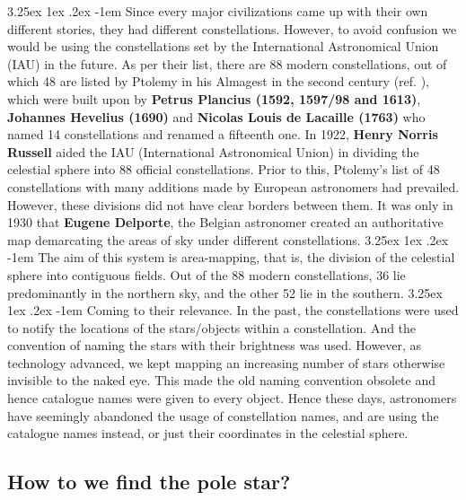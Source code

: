 \documentclass[a4paper,twoside,11pt]{article}
\makeatletter
\numberwithin{equation}{section}
\renewcommand\paragraph{\@startsection{paragraph}{5}{\z@}%
  {3.25ex \@plus1ex \@minus.2ex}%
  {-1em}%
  {\normalfont\normalsize\bfseries}}
\makeatother
\begin{document}
\paragraph{}
Since every major civilizations came up with their own different stories, they had different constellations. However, to avoid confusion we would be using the constellations set by the International Astronomical Union (IAU) in the future. As per their list, there are 88 modern constellations, out of which 48 are listed by Ptolemy in his Almagest in the second century (ref. \cite{wiki_constellation}), which were built upon by \textbf{Petrus Plancius (1592, 1597/98 and 1613)}, \textbf{Johannes Hevelius (1690)} and \textbf{Nicolas Louis de Lacaille (1763)} who named 14 constellations and renamed a fifteenth one. In 1922, \textbf{Henry Norris Russell} aided the IAU (International Astronomical Union) in dividing the celestial sphere into 88 official constellations. Prior to this, Ptolemy's list of 48 constellations with many additions made by European astronomers had prevailed. However, these divisions did not have clear borders between them. It was only in 1930 that \textbf{Eugene Delporte}, the Belgian astronomer created an authoritative map demarcating the areas of sky under different constellations.
\paragraph{}
The aim of this system is area-mapping, that is, the division of the celestial sphere into  contiguous fields. Out of the 88 modern constellations, 36 lie predominantly in the northern sky, and the other 52 lie in the southern. 
\paragraph{}
Coming to their relevance. In the past, the constellations were used to notify the locations of the stars/objects within a constellation. And the convention of naming the stars with their brightness was used. However, as technology advanced, we kept mapping an increasing number of stars otherwise invisible to the naked eye. This made the old naming convention obsolete and hence catalogue names were given to every object. Hence these days, astronomers have seemingly abandoned the usage of constellation names, and are using the catalogue names instead, or just their coordinates in the celestial sphere.
\newpage
\subsection{How to we find the pole star?}
\end{document}
